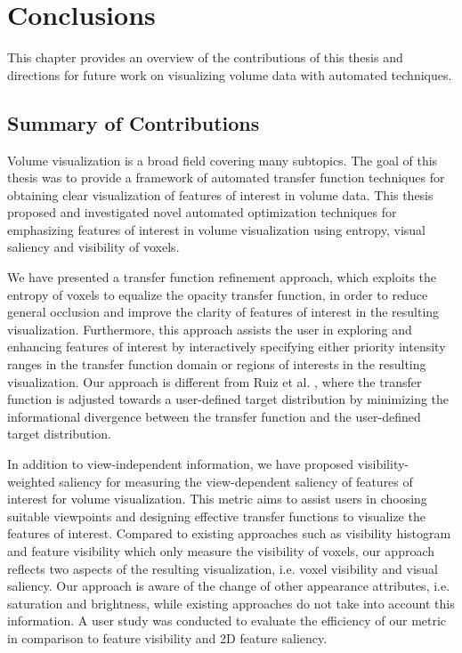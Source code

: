 \chapter{Conclusions \label{conclusions}}

This chapter provides an overview of the contributions of this thesis and directions for future work on visualizing volume data with automated techniques.

\section{Summary of Contributions}
Volume visualization is a broad field covering many subtopics. The goal of this thesis was to provide a framework of automated transfer function techniques for obtaining clear visualization of features of interest in volume data. This thesis proposed and investigated novel automated optimization techniques for emphasizing features of interest in volume visualization using entropy, visual saliency and visibility of voxels.

We have presented a transfer function refinement approach, which exploits the entropy of voxels to equalize the opacity transfer function, in order to reduce general occlusion and improve the clarity of features of interest in the resulting visualization.
Furthermore, this approach assists the user in exploring and enhancing features of interest by interactively specifying either priority intensity ranges in the transfer function domain or regions of interests in the resulting visualization.
Our approach is different from Ruiz et al. \cite{ruiz_automatic_2011}, where the transfer function is adjusted towards a user-defined target distribution by minimizing the informational divergence between the transfer function and the user-defined target distribution.

In addition to view-independent information, we have proposed visibility-weighted saliency for measuring the view-dependent saliency of features of interest for volume visualization.
This metric aims to assist users in choosing suitable viewpoints and designing effective transfer functions to visualize the features of interest.
Compared to existing approaches such as visibility histogram \cite{correa_visibility_2011} and feature visibility \cite{wang_efficient_2011} which only measure the visibility of voxels, our approach reflects two aspects of the resulting visualization, i.e. voxel visibility and visual saliency.
Our approach is aware of the change of other appearance attributes, i.e. saturation and brightness, while existing approaches do not take into account this information.
A user study was conducted to evaluate the efficiency of our metric in comparison to feature visibility and 2D feature saliency.

